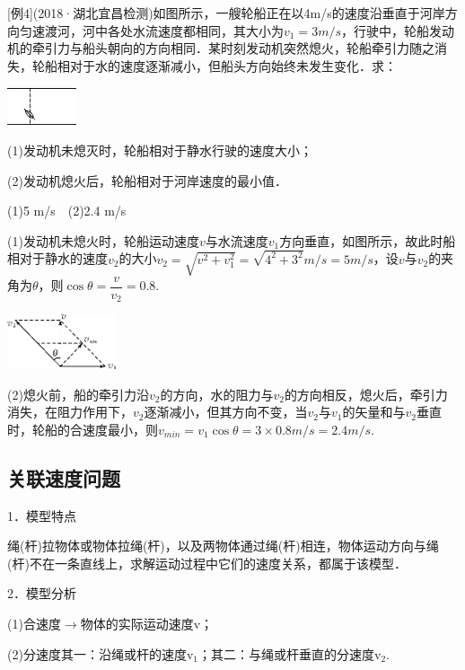 \documentclass[cn,10.5pt,chinese,mac,chinesefont=founder]{elegantbook}
\begin{document}
{[}例4{]}(2018·湖北宜昌检测)如图所示，一艘轮船正在以4m/s的速度沿垂直于河岸方向匀速渡河，河中各处水流速度都相同，其大小为$v_1=3m/s$，行驶中，轮船发动机的牵引力与船头朝向的方向相同．某时刻发动机突然熄火，轮船牵引力随之消失，轮船相对于水的速度逐渐减小，但船头方向始终未发生变化．求：

\begin{center}\includegraphics[width=0.80208in,height=0.4375in]{media/image149.png}\end{center}

(1)发动机未熄灭时，轮船相对于静水行驶的速度大小；

(2)发动机熄火后，轮船相对于河岸速度的最小值．
\begin{solution}(1)5 m/s　(2)2.4 m/s

	(1)发动机未熄火时，轮船运动速度$v$与水流速度$v_1$方向垂直，如图所示，故此时船相对于静水的速度$v_2$的大小$v_2=\sqrt{v^2+v_1^2}=\sqrt{4^2+3^2} m/s=5 m/s$，设$v$与$v_2$的夹角为$\theta$，则$\cos \theta=\dfrac{v}{v_2} =0.8$.
\begin{center}\includegraphics[width=1.26042in,height=0.63542in]{media/image150.png}\end{center}

(2)熄火前，船的牵引力沿$v_2$的方向，水的阻力与$v_2$的方向相反，熄火后，牵引力消失，在阻力作用下，$v_2$逐渐减小，但其方向不变，当$v_2$与$v_1$的矢量和与$v_2$垂直时，轮船的合速度最小，则$v_{min}=v_1\cos\theta=3\times 0.8 m/s=2.4 m/s$.
\end{solution}


\newpage
\subsection{关联速度问题}

1．模型特点

绳(杆)拉物体或物体拉绳(杆)，以及两物体通过绳(杆)相连，物体运动方向与绳(杆)不在一条直线上，求解运动过程中它们的速度关系，都属于该模型．

2．模型分析

(1)合速度$\rightarrow$物体的实际运动速度v；

(2)分速度其一：沿绳或杆的速度$\mathrm v_1$；其二：与绳或杆垂直的分速度$\mathrm v_2$.
\end{document}
